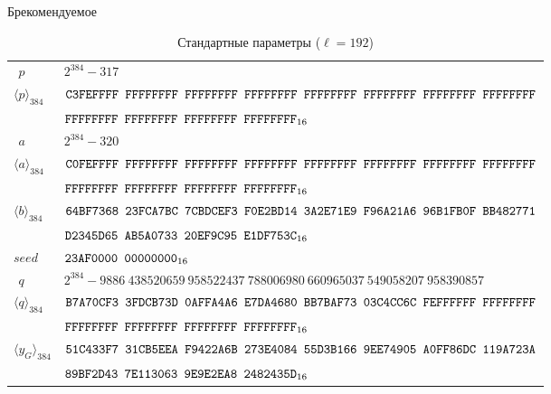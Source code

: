 \begin{appendix}{Б}{рекомендуемое}
\begin{table}[!h]
\caption{Стандартные параметры ($\ell=192$)}\label{Table.STD.StdCurve192}
{\small
\begin{tabular}{|l|l|}
\hline
$\phantom{\langle}p\phantom{\rangle}$ &
$2^{384}-317$\\
$\langle p\rangle_{384}$ & 
$\texttt{C3FEFFFF~FFFFFFFF~FFFFFFFF~FFFFFFFF~FFFFFFFF~FFFFFFFF~FFFFFFFF~FFFFFFFF}$\\
& 
$\texttt{FFFFFFFF~FFFFFFFF~FFFFFFFF~FFFFFFFF}_{16}$\\
%
\hline
$\phantom{\langle}a\phantom{\rangle}$ &
$2^{384}-320$\\
$\langle a\rangle_{384}$ & 
$\texttt{C0FEFFFF~FFFFFFFF~FFFFFFFF~FFFFFFFF~FFFFFFFF~FFFFFFFF~FFFFFFFF~FFFFFFFF}$\\
& 
$\texttt{FFFFFFFF~FFFFFFFF~FFFFFFFF~FFFFFFFF}_{16}$\\
%
\hline
$\langle b\rangle_{384}$ & 
$\texttt{64BF7368~23FCA7BC~7CBDCEF3~F0E2BD14~3A2E71E9~F96A21A6~96B1FB0F~BB482771}$\\
&
$\texttt{D2345D65~AB5A0733~20EF9C95~E1DF753C}_{16}$\\
%
\hline
$seed$ & 
$\texttt{23AF0000~00000000}_{16}$\\
%
\hline
$\phantom{\langle}q\phantom{\rangle}$ &
$2^{384}-9886~438520659~958522437~788006980~660965037~549058207~958390857$\\
$\langle q\rangle_{384}$ & 
$\texttt{B7A70CF3~3FDCB73D~0AFFA4A6~E7DA4680~BB7BAF73~03C4CC6C~FEFFFFFF~FFFFFFFF}$\\
&
$\texttt{FFFFFFFF~FFFFFFFF~FFFFFFFF~FFFFFFFF}_{16}$\\
%
\hline
$\langle y_G\rangle_{384}$ & 
$\texttt{51C433F7~31CB5EEA~F9422A6B~273E4084~55D3B166~9EE74905~A0FF86DC~119A723A}$\\
&
$\texttt{89BF2D43~7E113063~9E9E2EA8~2482435D}_{16}$\\
\hline
\end{tabular}
}
\end{table}

%
%
    

\end{appendix}
